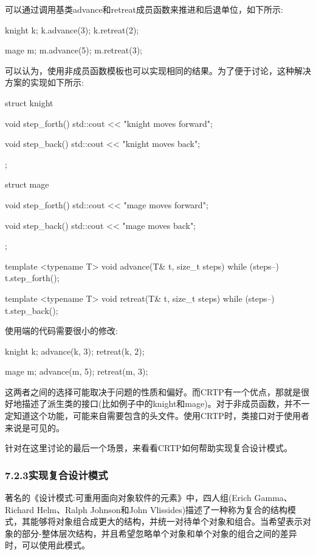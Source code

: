 可以通过调用基类advance和retreat成员函数来推进和后退单位，如下所示:

\begin{cpp}
knight k;
k.advance(3);
k.retreat(2);

mage m;
m.advance(5);
m.retreat(3);
\end{cpp}

可以认为，使用非成员函数模板也可以实现相同的结果。为了便于讨论，这种解决方案的实现如下所示:

\begin{cpp}
struct knight
{
	void step_forth()
	{ std::cout << "knight moves forward\n"; }
	
	void step_back()
	{ std::cout << "knight moves back\n"; }
};

struct mage
{
	void step_forth()
	{ std::cout << "mage moves forward\n"; }
	
	void step_back()
	{ std::cout << "mage moves back\n"; }
};

template <typename T>
void advance(T& t, size_t steps)
{
	while (steps--) t.step_forth();
}

template <typename T>
void retreat(T& t, size_t steps)
{
	while (steps--) t.step_back();
}
\end{cpp}

使用端的代码需要很小的修改:

\begin{cpp}
knight k;
advance(k, 3);
retreat(k, 2);

mage m;
advance(m, 5);
retreat(m, 3);
\end{cpp}

这两者之间的选择可能取决于问题的性质和偏好。而CRTP有一个优点，那就是很好地描述了派生类的接口(比如例子中的knight和mage)。对于非成员函数，并不一定知道这个功能，可能来自需要包含的头文件。使用CRTP时，类接口对于使用者来说是可见的。

针对在这里讨论的最后一个场景，来看看CRTP如何帮助实现复合设计模式。

\subsubsection{7.2.3\hspace{0.2cm}实现复合设计模式}

著名的《设计模式:可重用面向对象软件的元素》中，四人组(Erich Gamma、Richard Helm、Ralph Johnson和John Vlissides)描述了一种称为复合的结构模式，其能够将对象组合成更大的结构，并统一对待单个对象和组合。当希望表示对象的部分-整体层次结构，并且希望忽略单个对象和单个对象的组合之间的差异时，可以使用此模式。

